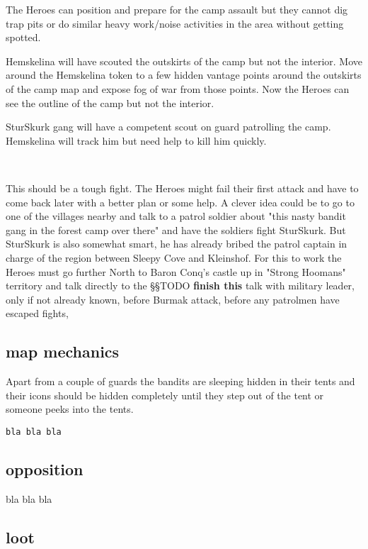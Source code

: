 The Heroes can position and prepare for the camp assault but they cannot dig trap pits or do similar heavy work/noise activities in the area without getting spotted.

Hemskelina will have scouted the outskirts of the camp but not the interior. Move around the Hemskelina token to a few hidden vantage points around the outskirts of the camp map and expose fog of war from those points. Now the Heroes can see the outline of the camp but not the interior.

SturSkurk gang will have a competent scout on guard patrolling the camp. Hemskelina will track him but need help to kill him quickly.

\

This should be a tough fight. The Heroes might fail their first attack and have to come back later with a better plan or some help.
A clever idea could be to go to one of the villages nearby and talk to a patrol soldier about "this nasty bandit gang in the forest camp over there" and have the soldiers fight SturSkurk. But SturSkurk is also somewhat smart, he has already bribed the patrol captain in charge of the region between Sleepy Cove and Kleinshof. For this to work the Heroes must go further North to Baron Conq's castle up in "Strong Hoomans" territory and talk directly to the
§§TODO \textbf{finish this} talk with military leader, only if not already known, before Burmak attack, before any patrolmen have escaped fights,



\subsection*{map mechanics}

Apart from a couple of guards the bandits are sleeping hidden in their tents and their icons should be hidden completely until they step out of the tent or someone peeks into the tents.

\small \begin{verbatim}
bla bla bla
\end{verbatim} \normalsize


\subsection*{opposition}

bla bla bla


\subsection*{loot}

